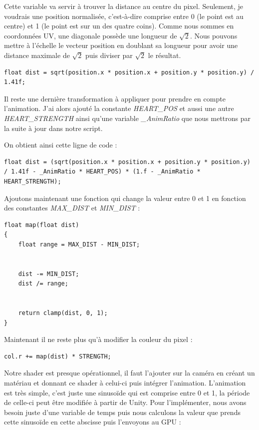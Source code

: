 \documentclass{article}
\begin{document}
Cette variable va servir à trouver la distance au centre du pixel. Seulement, je voudrais une position normalisée, c'est-à-dire comprise entre 0 (le point est au centre) et 1 (le point est sur un des quatre coins). Comme nous sommes en coordonnées UV, une diagonale possède une longueur de $\sqrt{2}$.
Nous pouvons mettre à l'échelle le vecteur position en doublant sa longueur pour avoir une distance maximale de $\sqrt{2}$ puis diviser par $\sqrt{2}$ le résultat.


\begin{lstlisting}
float dist = sqrt(position.x * position.x + position.y * position.y) / 1.41f;
\end{lstlisting}


Il reste une dernière transformation à appliquer pour prendre en compte l'animation.
J'ai alors ajouté la constante \emph{HEART\_POS} et aussi une autre \emph{HEART\_STRENGTH} ainsi qu'une variable \emph{\_AnimRatio} que nous mettrons par la suite à jour dans notre script.

On obtient ainsi cette ligne de code :


\begin{lstlisting}
float dist = (sqrt(position.x * position.x + position.y * position.y) / 1.41f - _AnimRatio * HEART_POS) * (1.f - _AnimRatio * HEART_STRENGTH);
\end{lstlisting}


Ajoutons maintenant une fonction qui change la valeur entre 0 et 1 en fonction des constantes \emph{MAX\_DIST} et \emph{MIN\_DIST} :


\begin{lstlisting}
float map(float dist)
{
	float range = MAX_DIST - MIN_DIST;


	dist -= MIN_DIST;
	dist /= range;


	return clamp(dist, 0, 1);
}
\end{lstlisting}


Maintenant il ne reste plus qu'à modifier la couleur du pixel :


\begin{lstlisting}
col.r += map(dist) * STRENGTH;
\end{lstlisting}


Notre shader est presque opérationnel, il faut l'ajouter sur la caméra en créant un matériau et donnant ce shader à celui-ci puis intégrer l'animation. L'animation est très simple, c'est juste une sinusoïde qui est comprise entre 0 et 1, la période de celle-ci peut être modifiée à partir de Unity. Pour l'implémenter, nous avons besoin juste d'une variable de temps puis nous calculons la valeur que prends cette sinusoïde en cette abscisse puis l'envoyons au GPU :
\end{document}
